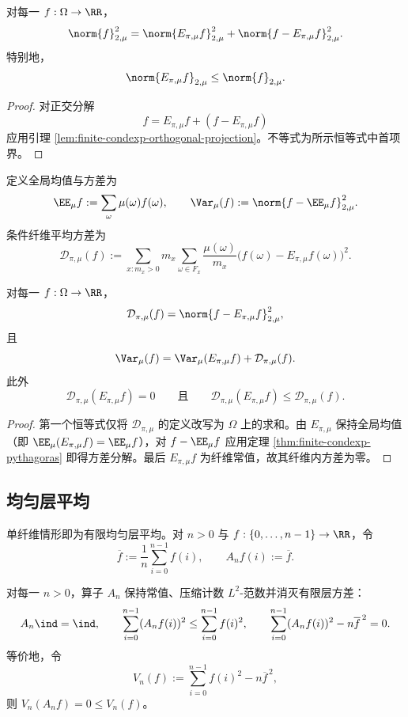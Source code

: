 \documentclass[../../main.tex]{subfiles}
\begin{document}
\begin{theorem}\label{thm:finite-condexp-pythagoras}
对每一 \(f:\Omega\to\RR\)，
\[
    \norm{f}_{2,\mu}^2
    =
    \norm{E_{\pi,\mu}f}_{2,\mu}^2
    +
    \norm{f-E_{\pi,\mu}f}_{2,\mu}^2 .
\]
特别地，
\[
    \norm{E_{\pi,\mu}f}_{2,\mu}\leq \norm{f}_{2,\mu}.
\]
\end{theorem}

\begin{proof}
对正交分解
\[
    f=E_{\pi,\mu}f+(f-E_{\pi,\mu}f)
\]
应用引理 \ref{lem:finite-condexp-orthogonal-projection}。不等式为所示恒等式中首项界。
\end{proof}

定义全局均值与方差为
\[
    \EE_\mu f:=\sum_{\omega}\mu(\omega)f(\omega),
    \qquad
    \Var_\mu(f):=\norm{f-\EE_\mu f}_{2,\mu}^2.
\]
条件纤维平均方差为
\[
    \mathcal D_{\pi,\mu}(f)
    :=
    \sum_{x:m_x>0}
    m_x
    \sum_{\omega\in F_x}
    \frac{\mu(\omega)}{m_x}
    \bigl(f(\omega)-E_{\pi,\mu}f(\omega)\bigr)^2 .
\]

\begin{corollary}[纤维方差分解]\label{cor:finite-condexp-variance-decomposition}
对每一 \(f:\Omega\to\RR\)，
\[
    \mathcal D_{\pi,\mu}(f)=\norm{f-E_{\pi,\mu}f}_{2,\mu}^2,
\]
且
\[
    \Var_\mu(f)=\Var_\mu(E_{\pi,\mu}f)+\mathcal D_{\pi,\mu}(f).
\]
此外
\[
    \mathcal D_{\pi,\mu}(E_{\pi,\mu}f)=0
    \qquad\text{且}\qquad
    \mathcal D_{\pi,\mu}(E_{\pi,\mu}f)\leq \mathcal D_{\pi,\mu}(f).
\]
\end{corollary}

\begin{proof}
第一个恒等式仅将 \(\mathcal D_{\pi,\mu}\) 的定义改写为 \(\Omega\) 上的求和。由 \(E_{\pi,\mu}\) 保持全局均值（即 \(\EE_\mu(E_{\pi,\mu}f)=\EE_\mu f\)），对 \(f-\EE_\mu f\) 应用定理 \ref{thm:finite-condexp-pythagoras} 即得方差分解。最后 \(E_{\pi,\mu}f\) 为纤维常值，故其纤维内方差为零。
\end{proof}

\subsection{均匀层平均}

单纤维情形即为有限均匀层平均。对 \(n>0\) 与 \(f:\{0,\ldots,n-1\}\to\RR\)，令
\[
    \overline f:=\frac{1}{n}\sum_{i=0}^{n-1}f(i),
    \qquad
    A_nf(i):=\overline f .
\]

\begin{theorem}\label{thm:finite-uniform-layer-variance-dissipation}
对每一 \(n>0\)，算子 \(A_n\) 保持常值、压缩计数 \(L^2\)-范数并消灭有限层方差：
\[
    A_n\ind=\ind,
    \qquad
    \sum_{i=0}^{n-1}(A_nf(i))^2\leq \sum_{i=0}^{n-1}f(i)^2,
    \qquad
    \sum_{i=0}^{n-1}(A_nf(i))^2-n\overline f^{\,2}=0 .
\]
等价地，令
\[
    V_n(f):=\sum_{i=0}^{n-1}f(i)^2-n\overline f^{\,2},
\]
则 \(V_n(A_nf)=0\leq V_n(f)\)。
\end{theorem}
\end{document}
